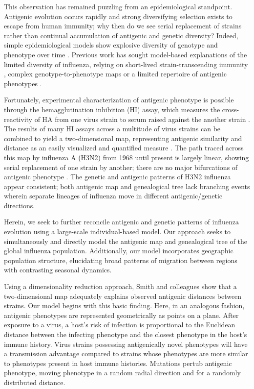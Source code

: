 This observation has remained puzzling from an epidemiological standpoint.  Antigenic evolution occurs rapidly and strong diversifying selection exists to escape from human immunity; why then do we see serial replacement of strains rather than continual accumulation of antigenic and genetic diversity?  Indeed, simple epidemiological models show explosive diversity of genotype and phenotype over time \cite{Ferguson03,Tria05}.  Previous work has sought model-based explanations of the limited diversity of influenza, relying on short-lived strain-transcending immunity \cite{Ferguson03,Tria05}, complex genotype-to-phenotype maps \cite{Koelle06} or a limited repertoire of antigenic phenotypes \cite{Recker07}. 

Fortunately, experimental characterization of antigenic phenotype is possible through the hemagglutination inhibition (HI) assay, which measures the cross-reactivity of HA from one virus strain to serum raised against the another strain \cite{Hirst43}.  The results of many HI assays across a multitude of virus strains can be combined to yield a two-dimensional map, representing antigenic similarity and distance as an easily visualized and quantified measure \cite{Smith04}.  The path traced across this map by influenza A (H3N2) from 1968 until present is largely linear, showing serial replacement of one strain by another; there are no major bifurcations of antigenic phenotype \cite{Smith04}.  The genetic and antigenic patterns of H3N2 influenza appear consistent; both antigenic map and genealogical tree lack branching events wherein separate lineages of influenza move in different antigenic/genetic directions.

Herein, we seek to further reconcile antigenic and genetic patterns of influenza evolution using a large-scale individual-based model.  Our approach seeks to simultaneously and directly model the antigenic map and genealogical tree of the global influenza population.  Additionally, our model incorporates geographic population structure, elucidating broad patterns of migration between regions with contrasting seasonal dynamics.

Using a dimensionality reduction approach, Smith and colleagues \cite{Smith04} show that a two-dimensional map adequately explains observed antigenic distances between strains.  Our model begins with this basic finding.  Here, in an analogous fashion, antigenic phenotypes are represented geometrically as points on a plane.  After exposure to a virus, a host's risk of infection is proportional to the Euclidean distance between the infecting phenotype and the closest phenotype in the host's immune history.  Virus strains possessing antigenically novel phenotypes will have a transmission advantage compared to strains whose phenotypes are more similar to phenotypes present in host immune histories.  Mutations pertub antigenic phenotype, moving phenotype in a random radial direction and for a randomly distributed distance.  

